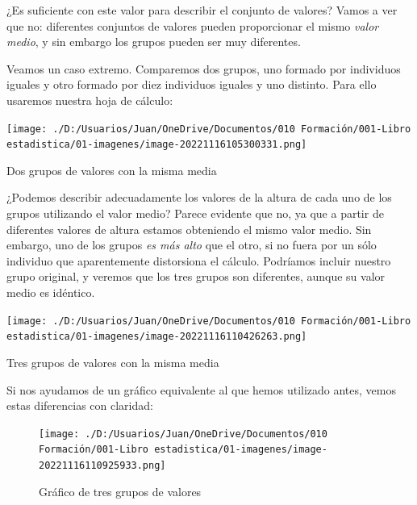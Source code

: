 \documentclass[
  letterpaper,
]{scrbook}
\begin{document}
¿Es suficiente con este valor para describir el conjunto de valores?
Vamos a ver que no: diferentes conjuntos de valores pueden proporcionar
el mismo \emph{valor medio}, y sin embargo los grupos pueden ser muy
diferentes.

Veamos un caso extremo. Comparemos dos grupos, uno formado por
individuos iguales y otro formado por diez individuos iguales y uno
distinto. Para ello usaremos nuestra hoja de cálculo:

\begin{marginfigure}

{\centering \texttt{[image: ./D:/Usuarios/Juan/OneDrive/Documentos/010 Formación/001-Libro estadistica/01-imagenes/image-20221116105300331.png]}

}

\caption{Dos grupos de valores con la misma media}

\end{marginfigure}

¿Podemos describir adecuadamente los valores de la altura de cada uno de
los grupos utilizando el valor medio? Parece evidente que no, ya que a
partir de diferentes valores de altura estamos obteniendo el mismo valor
medio. Sin embargo, uno de los grupos \emph{es más alto} que el otro, si
no fuera por un sólo individuo que aparentemente distorsiona el cálculo.
Podríamos incluir nuestro grupo original, y veremos que los tres grupos
son diferentes, aunque su valor medio es idéntico.

\begin{marginfigure}

{\centering \texttt{[image: ./D:/Usuarios/Juan/OneDrive/Documentos/010 Formación/001-Libro estadistica/01-imagenes/image-20221116110426263.png]}

}

\caption{Tres grupos de valores con la misma media}

\end{marginfigure}

Si nos ayudamos de un gráfico equivalente al que hemos utilizado antes,
vemos estas diferencias con claridad:

\begin{figure}

{\centering \texttt{[image: ./D:/Usuarios/Juan/OneDrive/Documentos/010 Formación/001-Libro estadistica/01-imagenes/image-20221116110925933.png]}

}

\caption{Gráfico de tres grupos de valores}

\end{figure}
\end{document}
